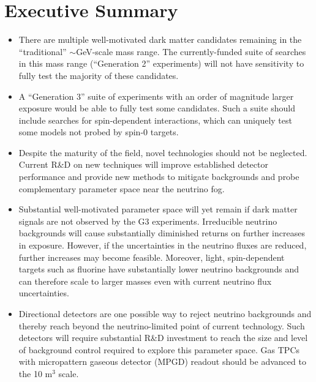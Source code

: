 \newpage
\section*{Executive Summary}
\label{sec:execsummary}
\begin{itemize}
    \item There are multiple well-motivated dark matter candidates remaining in the ``traditional'' $\sim$GeV-scale mass range. The currently-funded suite of searches in this mass range (``Generation 2'' experiments) will not have sensitivity to fully test the majority of these candidates. 
    \item A ``Generation 3'' suite of experiments with an order of magnitude larger exposure would be able to fully test some candidates. Such a suite should include searches for spin-dependent interactions, which can uniquely test some models not probed by spin-0 targets. 
    \item Despite the maturity of the field, novel technologies should not be neglected. Current R\&D on new techniques will improve established  detector performance and provide new methods to mitigate backgrounds and probe complementary parameter space near the neutrino fog. 
    \item Substantial well-motivated parameter space will yet remain if dark matter signals are not observed by the G3 experiments. Irreducible neutrino backgrounds will cause substantially diminished returns on further increases in exposure. However, if the uncertainties in the neutrino fluxes are reduced, further increases may become feasible. Moreover, light, spin-dependent targets such as fluorine have substantially lower neutrino backgrounds and can therefore scale to larger masses even with current neutrino flux uncertainties. 
    \item Directional detectors are one possible way to reject neutrino backgrounds and thereby reach beyond the neutrino-limited point of current technology. Such detectors will require substantial R\&D investment to reach the size and level of background control required to explore this parameter space. Gas TPCs with micropattern gaseous detector (MPGD) readout should be advanced to the 10 m$^3$ scale. 
\end{itemize}